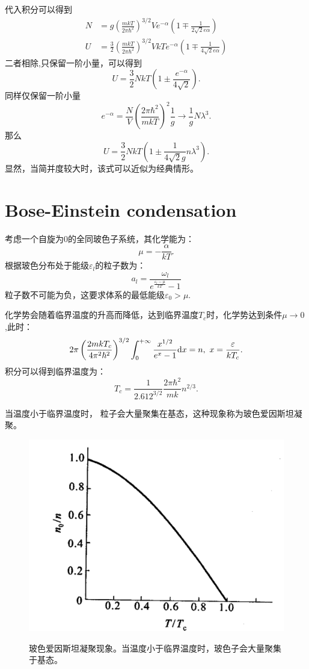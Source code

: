 代入积分可以得到
\begin{align}
    N&=g\left(\frac{mkT}{2\pi\hbar^2}\right)^{3/2}Ve^{-\alpha}\left(1\mp\frac{1}{2\sqrt{2}e\alpha}\right)\\
    U&=\frac{3}{2}\left(\frac{mkT}{2\pi\hbar^2}\right)^{3/2}VkTe^{-\alpha}\left(1\mp\frac{1}{4\sqrt{2}e\alpha}\right)
\end{align}
二者相除,只保留一阶小量，可以得到
\begin{equation}
    U=\frac{3}{2}NkT\left(1\pm\frac{e^{-\alpha}}{4\sqrt{2}}\right).
\end{equation}
同样仅保留一阶小量 
\begin{equation}
    e^{-\alpha}=\frac{N}{V}\left(\frac{2\pi\hbar^2}{mkT}\right)^2\frac{1}{g} \to \frac{1}{g}N\lambda^3.
\end{equation}
那么
\begin{equation}
    U=\frac{3}{2}NkT\left(1\pm\frac{1}{4\sqrt{2}g}n\lambda^3\right).
\end{equation}
显然，当简并度较大时，该式可以近似为经典情形。
\section{Bose-Einstein condensation}
考虑一个自旋为0的全同玻色子系统，其化学能为：
\begin{equation}
    \mu=-\frac{\alpha}{kT}.
\end{equation}
根据玻色分布处于能级$\varepsilon_l$的粒子数为：
\begin{equation}
    a_l=\frac{\omega_l}{e^{\frac{\varepsilon_l-\mu}{kT}}-1}
\end{equation}
粒子数不可能为负，这要求体系的最低能级$\varepsilon_0>\mu$.

化学势会随着临界温度的升高而降低，达到临界温度$T_c$时，化学势达到条件$\mu\to 0$ ,此时：
\begin{equation}
    2\pi\left(\frac{2mkT_c}{4\pi^2\hbar^2}\right)^{3/2}\int_0^{+\infty}\frac{x^{1/2}}{e^x-1}\mathrm{d} x=n, \ x=\frac{\varepsilon}{kT_c}.
\end{equation}
积分可以得到临界温度为：
\begin{equation}
    T_c=\frac{1}{2.612^{3/2}}\frac{2\pi\hbar^2}{mk}n^{2/3}.
\end{equation}

当温度小于临界温度时， 粒子会大量聚集在基态，这种现象称为玻色爱因斯坦凝聚。
\begin{figure}[htb]
    \centering 
    \includegraphics[width=0.5\linewidth]{fig/ch4_BEcom.png}
    \label{BEcom}
    \caption{玻色爱因斯坦凝聚现象。当温度小于临界温度时，玻色子会大量聚集于基态。\cite{wang_2003}}
\end{figure}
